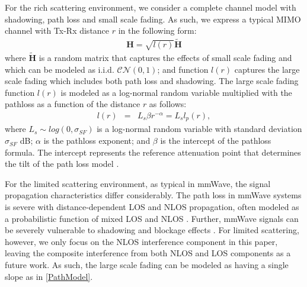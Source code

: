 \documentclass[12pt, draftclsnofoot, onecolumn]{IEEEtran}
\theoremstyle{plain}
\begin{document}
%
For the rich scattering environment, we consider a complete channel model with shadowing, path loss and small scale fading. 
%
As such, we express a typical MIMO channel with Tx-Rx distance $r$ in the following form: \vspace{-.15in}
\begin{eqnarray}
\mathbf{H}=\sqrt{\mathit{l}(r)} \mathbf{\tilde{H}}%
\end{eqnarray}
where $\mathbf{\tilde{H}}$ is a random matrix that captures the effects of small scale fading and which can be modeled as i.i.d. $\mathcal{CN}({0},1) $; and function $\mathit{l}(r)$ captures the large scale fading which includes both path loss and shadowing. 
%
The large scale fading function $\mathit{l}(r)$ is modeled as a log-normal random variable multiplied with the pathloss as a function of the distance $r$ as follows: \vspace{-.1in}
\begin{eqnarray}\label{PathModel}
\mathit{l}(r)&=&\mathit{L}_s \beta r^{-\alpha} = \mathit{L}_s \mathit{l}_p(r),
\end{eqnarray} 
where {$\mathit{L}_{s} \sim log(0,\sigma_{SF})$} is a log-normal random variable with standard deviation {$\sigma_{SF}$} dB; $\alpha$ is the pathloss exponent; and $\beta$ is the intercept of the pathloss formula. The intercept represents the reference attenuation point that determines the tilt of the path loss model \cite{maccartney2013path}.

For the limited scattering environment, as typical in mmWave,  the signal propagation characteristics differ  considerably. The path loss in mmWave systems is severe with distance-dependent LOS and NLOS propagation, often modeled as a probabilistic function of mixed LOS and NLOS \cite{Baimm14, BaiH14}. Further, mmWave signals can be severely vulnerable to shadowing and blockage effects \cite{mmWave4}. For limited scattering, however, we only focus on the NLOS interference component in this paper, leaving the composite interference from both NLOS and LOS components as a future work. As such, the large scale fading can be modeled as having a single slope as in \eqref{PathModel}.
\end{document}
